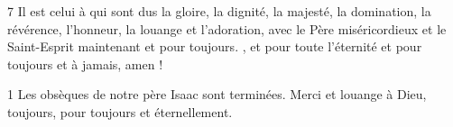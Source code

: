 \par 7 Il est celui à qui sont dus la gloire, la dignité, la majesté, la domination, la révérence, l'honneur, la louange et l'adoration, avec le Père miséricordieux et le Saint-Esprit maintenant et pour toujours. , et pour toute l'éternité et pour toujours et à jamais, amen !


\par 1 Les obsèques de notre père Isaac sont terminées. Merci et louange à Dieu, toujours, pour toujours et éternellement.



